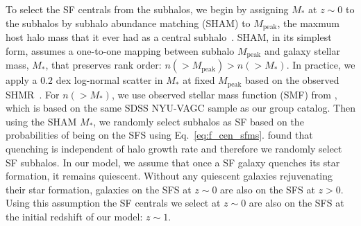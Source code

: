 \documentclass[12pt, letterpaper, preprint, tighten]{aastex62}
\begin{document}
To select the SF centrals from the subhalos, we begin by assigning $M_*$
at $z\sim 0$ to the subhalos by subhalo abundance matching (SHAM) to $M_\mathrm{peak}$,
the maxmum host halo mass that it ever had as a central subhalo~\citep{conroy2006,vale2006,yang2009,wetzel2012,leja2013,wetzel2013,wetzel2014,hahn2017b}.
SHAM, in its simplest form, assumes a one-to-one mapping between subhalo
$M_\mathrm{peak}$ and galaxy stellar mass, $M_*$, that preserves rank
order: $n({>}M_\mathrm{peak}) > n({>}M_*)$. In practice, we apply a $0.2$
dex log-normal scatter in $M_*$ at fixed $M_\mathrm{peak}$ based on the
observed SHMR~\citep[\emph{e.g.}][]{mandelbaum2006a, more2011, velander2014, zu2015, gu2016, lange2018a}.
For $n({>}M_*)$, we use observed stellar mass function (SMF)
from \cite{li2009}, which is based on the same SDSS NYU-VAGC sample as our
group catalog. Then using the SHAM $M_*$, we randomly select subhalos as
SF based on the probabilities of being on the SFS using Eq.~\ref{eq:f_cen_sfms}.
\cite{tinker2017b,tinker2018} found that quenching is
independent of halo growth rate and therefore we randomly select SF subhalos.
In our model, we assume that once a SF galaxy quenches its star formation,
it remains quiescent.  %
Without any quiescent galaxies rejuvenating their star formation, galaxies
on the SFS at $z\sim0$ are also on the SFS at $z > 0$. Using this assumption
the SF centrals we select at $z \sim 0$ are also on the SFS at the initial
redshift of our model: $z \sim 1$.
\end{document}
